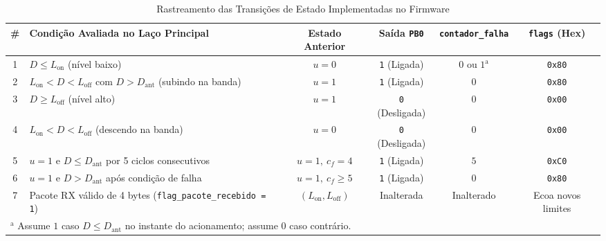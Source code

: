 \documentclass[conference]{IEEEtran}
\begin{document}
\begin{table}[htbp]
	\caption{Rastreamento das Transições de Estado Implementadas no Firmware}
	\label{tab:rastreamento}
	\centering
	\footnotesize
	\begin{tabularx}{\textwidth}{@{}cXcccc@{}}
		\toprule
		\textbf{\#} & \textbf{Condição Avaliada no Laço Principal}                                     & \textbf{Estado Anterior}          & \textbf{Saída \texttt{PB0}} & \textbf{\texttt{contador\_falha}} & \textbf{\texttt{flags} (Hex)} \\
		\midrule
		1           & $D \le L_{\text{on}}$ (nível baixo)                                              & $u = 0$                           & \texttt{1} (Ligada)         & $0$ ou $1^{\mathrm{a}}$           & \texttt{0x80}                 \\
		2           & $L_{\text{on}} < D < L_{\text{off}}$ com $D > D_{\text{ant}}$ (subindo na banda) & $u = 1$                           & \texttt{1} (Ligada)         & $0$                               & \texttt{0x80}                 \\
		3           & $D \ge L_{\text{off}}$ (nível alto)                                              & $u = 1$                           & \texttt{0} (Desligada)      & $0$                               & \texttt{0x00}                 \\
		4           & $L_{\text{on}} < D < L_{\text{off}}$ (descendo na banda)                         & $u = 0$                           & \texttt{0} (Desligada)      & $0$                               & \texttt{0x00}                 \\
		5           & $u = 1$ e $D \le D_{\text{ant}}$ por 5 ciclos consecutivos                       & $u = 1,\ c_f = 4$                 & \texttt{1} (Ligada)         & $5$                               & \texttt{0xC0}                 \\
		6           & $u = 1$ e $D > D_{\text{ant}}$ após condição de falha                            & $u = 1,\ c_f \ge 5$               & \texttt{1} (Ligada)         & $0$                               & \texttt{0x80}                 \\
		7           & Pacote RX válido de 4 bytes (\texttt{flag\_pacote\_recebido = 1})                & $(L_{\text{on}}, L_{\text{off}})$ & Inalterada                  & Inalterado                        & Ecoa novos limites            \\
		\bottomrule
		\multicolumn{6}{l}{$^{\mathrm{a}}$ Assume $1$ caso $D \le D_{\text{ant}}$ no instante do acionamento; assume $0$ caso contrário.}
	\end{tabularx}
\end{table}
\end{document}
